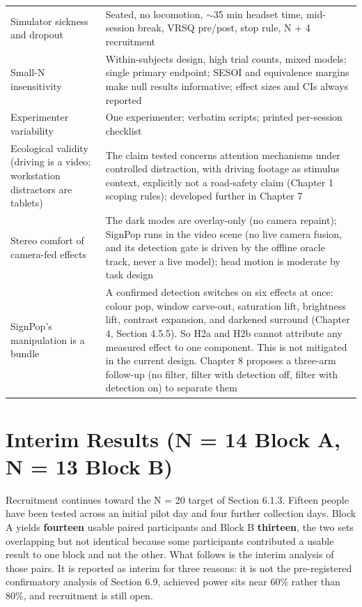 \begin{longtable}{p{}|p{}}
Simulator sickness and dropout & Seated, no locomotion, $\sim$35 min headset time, mid-session break, VRSQ pre/post, stop rule, N + 4 recruitment \\
Small-N insensitivity & Within-subjects design, high trial counts, mixed models; single primary endpoint; SESOI and equivalence margins make null results informative; effect sizes and CIs always reported \\
Experimenter variability & One experimenter; verbatim scripts; printed per-session checklist \\
Ecological validity (driving is a video; workstation distractors are tablets) & The claim tested concerns attention mechanisms under controlled distraction, with driving footage as stimulus context, explicitly not a road-safety claim (Chapter 1 scoping rules); developed further in Chapter 7 \\
Stereo comfort of camera-fed effects & The dark modes are overlay-only (no camera repaint); SignPop runs in the video scene (no live camera fusion, and its detection gate is driven by the offline oracle track, never a live model); head motion is moderate by task design \\
SignPop's manipulation is a bundle & A confirmed detection switches on six effects at once: colour pop, window carve-out, saturation lift, brightness lift, contrast expansion, and darkened surround (Chapter 4, Section 4.5.5). So H2a and H2b cannot attribute any measured effect to one component. This is not mitigated in the current design. Chapter 8 proposes a three-arm follow-up (no filter, filter with detection off, filter with detection on) to separate them \\
\hline
\end{longtable}

\section{Interim Results (N = 14 Block A, N = 13 Block B)}

Recruitment continues toward the N = 20 target of Section 6.1.3. Fifteen people have been tested
across an initial pilot day and four further collection days. Block A yields \textbf{fourteen} usable
paired participants and Block B \textbf{thirteen}, the two sets overlapping but not identical because
some participants contributed a usable result to one block and not the other. What follows is the
interim analysis of those pairs. It is reported as interim for three reasons: it is not the
pre-registered confirmatory analysis of Section 6.9, achieved power sits near 60\% rather than 80\%,
and recruitment is still open.

